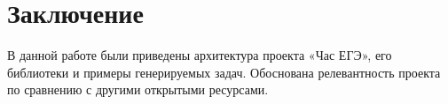 \section*{Заключение}
В данной работе были приведены архитектура проекта «Час ЕГЭ», его библиотеки
и примеры генерируемых задач. Обоснована релевантность проекта по сравнению
с другими открытыми ресурсами.

